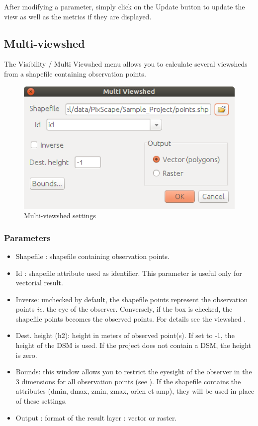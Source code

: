 \documentclass{report}
\begin{document}
After modifying a parameter, simply click on the Update button to update the view as well as the metrics if they are displayed.


\subsection{Multi-viewshed}
\label{multi_viewshed}
The Visibility / Multi Viewshed menu allows you to calculate several viewsheds from a shapefile containing observation points.

\begin{figure}[H]
	\includegraphics[scale=0.5]{img/multi_viewshed-en.png} 
	\caption{Multi-viewshed settings}
	\label{multi_viewshed_dlg}
\end{figure}

\subsubsection{Parameters}

\begin{itemize}
	\item Shapefile : shapefile containing observation points.
	\item Id : shapefile attribute used as identifier. This parameter is useful only for vectorial result.
	\item Inverse: unchecked by default, the shapefile points represent the observation points \textit{ie.} the eye of the observer. Conversely, if the box is checked, the shapefile points becomes the observed points. For details see the viewshed .
	\item Dest. height (h2): height in meters of observed point(s). If set to -1, the height of the DSM is used. If the project does not contain a DSM, the height is zero.
	\item Bounds: this window allows you to restrict the eyesight of the observer in the 3 dimensions for all observation points (see ). If the shapefile contains the attributes (dmin, dmax, zmin, zmax, orien et amp), they will be used in place of these settings.
	\item Output : format of the result layer : vector or raster.
\end{itemize}
\end{document}
